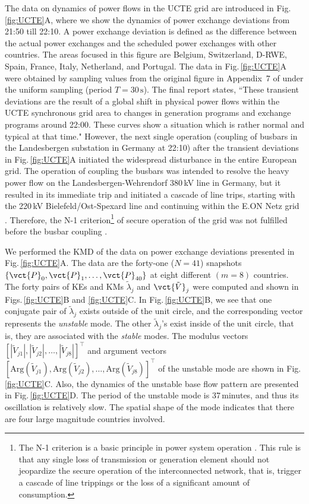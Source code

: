 \documentclass[a4paper,10pt]{article}
\begin{document}
%
The data on dynamics of power flows in the UCTE grid are introduced in Fig.\,\ref{fig:UCTE}A, where we show the dynamics of power exchange deviations from 21:50 till 22:10.  
A power exchange deviation is defined as the difference between the actual power exchanges and the scheduled power exchanges with other countries.  
The areas focused in this figure are Belgium, Switzerland, D-RWE, Spain, France, Italy, Netherland, and Portugal.   
The data in Fig.\,\ref{fig:UCTE}A were obtained by sampling values from the original figure in Appendix~7 of \cite{UCTE:2006} under the uniform sampling (period $T=30\,\mathrm{s}$).  
The final report \cite{UCTE:2006} states, ``These transient deviations are the result of a global shift in physical power flows within the UCTE synchronous grid area to changes in generation programs and exchange programs around 22:00.  
These curves show a situation which is rather normal and typical at that time."  
However, the next single operation (coupling of busbars in the Landesbergen substation in Germany at 22:10) after the transient deviations in Fig.\,\ref{fig:UCTE}A initiated the widespread disturbance in the entire European grid.  
The operation of coupling the busbars was intended to resolve the heavy power flow on the Landesbergen-Wehrendorf 380\,kV line in Germany, but it resulted in its immediate trip and initiated a cascade of line trips, starting with the 220\,kV Bielefeld/Ost-Spexard line and continuing within the E.ON Netz grid \cite{UCTE:2006}.   
Therefore, the N-1 criterion\footnote{The N-1 criterion is a basic principle in power system operation \cite{UCTE:2006}.  This rule is that any single loss of transmission or generation element should not jeopardize the secure operation of the interconnected network, that is, trigger a cascade of line trippings or the loss of a significant amount of consumption.} of secure operation of the grid was not fulfilled before the busbar coupling \cite{UCTE:2006}. 

% 
We performed the KMD of the data on power exchange deviations presented in Fig.\,\ref{fig:UCTE}A.  
The data are the forty-one ($N=41$) snapshots $\{\vct{P}_0,\vct{P}_1,\ldots,\vct{P}_{40}\}$ at eight different $(m=8)$ countries.  
The forty pairs of KEs and KMs $\tilde{\lambda}_j$ and $\vct{\tilde{V}}_j$ were computed and shown in Figs.\,\ref{fig:UCTE}B and \ref{fig:UCTE}C. 
In Fig.\,\ref{fig:UCTE}B, we see that one conjugate pair of $\tilde{\lambda}_j$ exists outside of the unit circle, and the corresponding vector represents the \emph{unstable} mode.  
The other $\tilde{\lambda}_j$'s exist inside of the unit circle, that is, they are associated with the \emph{stable} modes.  
The modulus vectors $[|\tilde{V}_{j1}|,|\tilde{V}_{j2}|,\ldots,|\tilde{V}_{j8}|]^\top$ and argument vectors $[\mathrm{Arg}(\tilde{V}_{j1}),\mathrm{Arg}(\tilde{V}_{j2}),\ldots,\mathrm{Arg}(\tilde{V}_{j8})]^\top$ of the unstable mode are shown in Fig.\,\ref{fig:UCTE}C.  
Also, the dynamics of the unstable base flow pattern are presented in Fig.\,\ref{fig:UCTE}D.  
The period of the unstable mode is 37\,minutes, and thus its oscillation is relatively slow.    
The spatial shape of the mode indicates that there are four large magnitude countries involved.  
\end{document}
